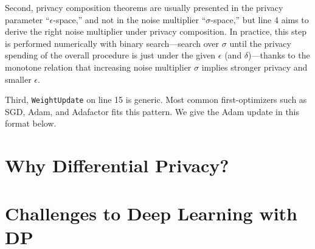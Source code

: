 Second, privacy composition theorems are usually presented in the privacy parameter ``$\epsilon$-space,'' and not in the noise multiplier ``$\sigma$-space,'' but line 4 aims to derive the right noise multiplier under privacy composition.
In practice, this step is performed numerically with binary search---search over $\sigma$ until the privacy spending of the overall procedure is just under the given $\epsilon$ (and $\delta$)---thanks to the monotone relation that increasing noise multiplier $\sigma$ implies stronger privacy and smaller $\epsilon$.

Third, \texttt{WeightUpdate} on line 15 is generic. Most common first-optimizers such as SGD, Adam, and Adafactor fits this pattern. 
We give the Adam update in this format below.




\section{Why Differential Privacy?}

\section{Challenges to Deep Learning with DP}

